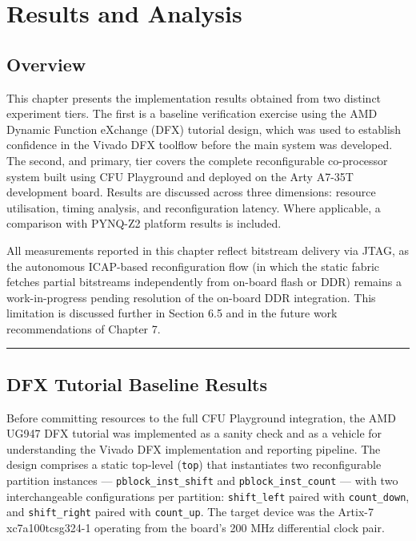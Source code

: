 \chapter{Results and Analysis}

\section{Overview}

This chapter presents the implementation results obtained from two distinct experiment tiers. The first is a baseline verification exercise using the AMD Dynamic Function eXchange (DFX) tutorial design, which was used to establish confidence in the Vivado DFX toolflow before the main system was developed. The second, and primary, tier covers the complete reconfigurable co-processor system built using CFU Playground and deployed on the Arty A7-35T development board. Results are discussed across three dimensions: resource utilisation, timing analysis, and reconfiguration latency. Where applicable, a comparison with PYNQ-Z2 platform results is included.

All measurements reported in this chapter reflect bitstream delivery via JTAG, as the autonomous ICAP-based reconfiguration flow (in which the static fabric fetches partial bitstreams independently from on-board flash or DDR) remains a work-in-progress pending resolution of the on-board DDR integration. This limitation is discussed further in Section 6.5 and in the future work recommendations of Chapter 7.

\vspace{0.4em}\hrule\vspace{0.4em}

\section{DFX Tutorial Baseline Results}

Before committing resources to the full CFU Playground integration, the AMD UG947 DFX tutorial was implemented as a sanity check and as a vehicle for understanding the Vivado DFX implementation and reporting pipeline. The design comprises a static top-level (\texttt{top}) that instantiates two reconfigurable partition instances — \texttt{pblock\_inst\_shift} and \texttt{pblock\_inst\_count} — with two interchangeable configurations per partition: \texttt{shift\_left} paired with \texttt{count\_down}, and \texttt{shift\_right} paired with \texttt{count\_up}. The target device was the Artix-7 xc7a100tcsg324-1 operating from the board's 200 MHz differential clock pair.

